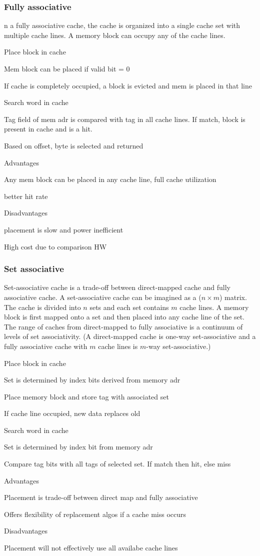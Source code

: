 \documentclass[a4paper, fontsize=8pt, landscape, DIV=1]{scrartcl}
\makeatletter
\renewenvironment{outline}[1][]{%
  \ifthenelse{\equal{#1}{}}{}{\renewcommand{\ol@type}{#1}}%
  \ol@z%
  \newcommand{\0}{\ol@toz\ol@z}%
  \newcommand{\1}{\vspace{\dimexpr\outlinespacingscalar\baselineskip-\baselineskip}\ol@toi\ol@i\item}%
  \newcommand{\2}{\vspace{\dimexpr\outlinespacingscalartwo\baselineskip-\baselineskip}\ol@toii\ol@ii\item}%
  \newcommand{\3}{\vspace{\dimexpr\outlinespacingscalar\baselineskip-\baselineskip}\ol@toiii\ol@iii\item}%
  \newcommand{\4}{\vspace{\dimexpr\outlinespacingscalar\baselineskip-\baselineskip}\ol@toiiii\ol@iiii\item}%
}{%
  \ol@toz\ol@exit%
}
\def\outlinespacingscalar{0.5}
\def\outlinespacingscalartwo{0.5}
\makeatother
\begin{document}
\begin{multicols*}{4}
  \vfill\null
  \columnbreak
  \subsubsection{Fully associative}
  n a fully associative cache, the cache is organized into a single cache set with multiple 
  cache lines. A memory block can occupy any of the cache lines.
  \begin{outline}
    \1 Place block in cache
      \2 Mem block can be placed if valid bit = 0
      \2 If cache is completely occupied, a block is evicted and mem is placed in that line
    \1 Search word in cache
      \2 Tag field of mem adr is compared with tag in all cache lines. If match, block is present in cache
      and is a hit.
      \2 Based on offset, byte is selected and returned
    \1 Advantages
      \2 Any mem block can be placed in any cache line, full cache utilization
      \2 better hit rate
    \1 Disadvantages
      \2 placement is slow and power inefficient
      \2 High cost due to comparison HW
  \end{outline}

  \vfill\null
  \columnbreak
  \subsubsection{Set associative}
  Set-associative cache is a trade-off between direct-mapped cache and fully associative cache.
  A set-associative cache can be imagined as a ($n\times m$) matrix. The cache is divided into $n$
  sets and each set contains $m$ cache lines. A memory block is first mapped onto a set and then
  placed into any cache line of the set. The range of caches from direct-mapped to fully associative 
  is a continuum of levels of set associativity. (A direct-mapped cache is one-way set-associative 
  and a fully associative cache with $m$ cache lines is $m$-way set-associative.) 
  \begin{outline}
    \1 Place block in cache
      \2 Set is determined by index bits derived from memory adr
      \2 Place memory block and store tag with associated set
      \2 If cache line occupied, new data replaces old
    \1 Search word in cache
      \2 Set is determined by index bit from memory adr
      \2 Compare tag bits with all tags of selected set. If match then hit, else miss
    \1 Advantages
      \2 Placement is trade-off between direct map and fully associative
      \2 Offers flexibility of replacement algos if a cache miss occurs
    \1 Disadvantages
      \2 Placement will not effectively use all availabe cache lines
  \end{outline}




\end{multicols*}
\end{document}
